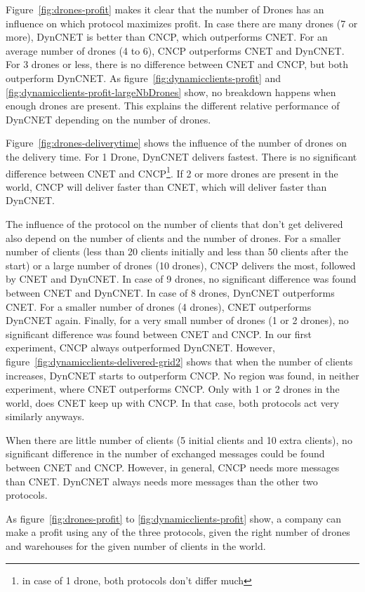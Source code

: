 \documentclass[10pt,a4paper]{article}
\begin{document}
Figure~\ref{fig:drones-profit} makes it clear that the number of Drones has an influence on which protocol maximizes profit. In case there are many drones (7 or more), DynCNET is better than CNCP, which outperforms CNET. For an average number of drones (4 to 6), CNCP outperforms CNET and DynCNET. For 3 drones or less, there is no difference between CNET and CNCP, but both outperform DynCNET. As figure~\ref{fig:dynamicclients-profit} and \ref{fig:dynamicclients-profit-largeNbDrones} show, no breakdown happens when enough drones are present. This explains the different relative performance of DynCNET depending on the number of drones.

Figure~\ref{fig:drones-deliverytime} shows the influence of the number of drones on the delivery time. For 1 Drone, DynCNET delivers fastest. There is no significant difference between CNET and CNCP\footnote{in case of 1 drone, both protocols don't differ much}. If 2 or more drones are present in the world, CNCP will deliver faster than CNET, which will deliver faster than DynCNET.

The influence of the protocol on the number of clients that don't get delivered also depend on the number of clients and the number of drones. For a smaller number of clients (less than 20 clients initially and less than 50 clients after the start) or a large number of drones (10 drones), CNCP delivers the most, followed by CNET and DynCNET. In case of 9 drones, no significant difference was found between CNET and DynCNET. In case of 8 drones, DynCNET outperforms CNET. For a smaller number of drones (4 drones), CNET outperforms DynCNET again. Finally, for a very small number of drones (1 or 2 drones), no significant difference was found between CNET and CNCP. In our first experiment, CNCP always outperformed DynCNET. However, figure~\ref{fig:dynamicclients-delivered-grid2} shows that when the number of clients increases, DynCNET starts to outperform CNCP. No region was found, in neither experiment, where CNET outperforms CNCP. Only with 1 or 2 drones in the world, does CNET keep up with CNCP. In that case, both protocols act very similarly anyways.

When there are little number of clients (5 initial clients and 10 extra clients), no significant difference in the number of exchanged messages could be found between CNET and CNCP. However, in general, CNCP needs more messages than CNET. DynCNET always needs more messages than the other two protocols.

As figure~\ref{fig:drones-profit} to \ref{fig:dynamicclients-profit} show, a company can make a profit using any of the three protocols, given the right number of drones and warehouses for the given number of clients in the world.
\end{document}
